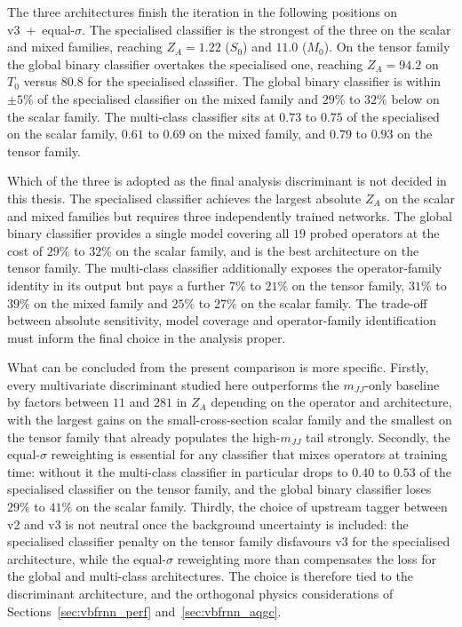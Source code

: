 The three architectures finish the iteration in the following positions on v3~+~equal-$\sigma$. The specialised classifier is the strongest of the three on the scalar and mixed families, reaching $Z_A=1.22$ ($S_0$) and $11.0$ ($M_0$). On the tensor family the global binary classifier overtakes the specialised one, reaching $Z_A=94.2$ on $T_0$ versus $80.8$ for the specialised classifier. The global binary classifier is within $\pm 5\%$ of the specialised classifier on the mixed family and $29\%$ to $32\%$ below on the scalar family. The multi-class classifier sits at $0.73$ to $0.75$ of the specialised on the scalar family, $0.61$ to $0.69$ on the mixed family, and $0.79$ to $0.93$ on the tensor family.

Which of the three is adopted as the final analysis discriminant is not decided in this thesis. The specialised classifier achieves the largest absolute $Z_A$ on the scalar and mixed families but requires three independently trained networks. The global binary classifier provides a single model covering all $19$ probed operators at the cost of $29\%$ to $32\%$ on the scalar family, and is the best architecture on the tensor family. The multi-class classifier additionally exposes the operator-family identity in its output but pays a further $7\%$ to $21\%$ on the tensor family, $31\%$ to $39\%$ on the mixed family and $25\%$ to $27\%$ on the scalar family. The trade-off between absolute sensitivity, model coverage and operator-family identification must inform the final choice in the analysis proper.

What can be concluded from the present comparison is more specific. Firstly, every multivariate discriminant studied here outperforms the $m_{JJ}$-only baseline by factors between $11$ and $281$ in $Z_A$ depending on the operator and architecture, with the largest gains on the small-cross-section scalar family and the smallest on the tensor family that already populates the high-$m_{JJ}$ tail strongly. Secondly, the equal-$\sigma$ reweighting is essential for any classifier that mixes operators at training time: without it the multi-class classifier in particular drops to $0.40$ to $0.53$ of the specialised classifier on the tensor family, and the global binary classifier loses $29\%$ to $41\%$ on the scalar family. Thirdly, the choice of upstream tagger between v2 and v3 is not neutral once the background uncertainty is included: the specialised classifier penalty on the tensor family disfavours v3 for the specialised architecture, while the equal-$\sigma$ reweighting more than compensates the loss for the global and multi-class architectures. The choice is therefore tied to the discriminant architecture, and the orthogonal physics considerations of Sections~\ref{sec:vbfrnn_perf} and~\ref{sec:vbfrnn_aqgc}.
